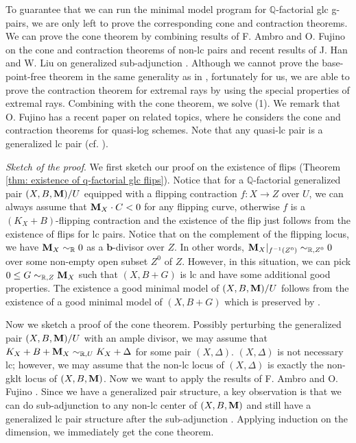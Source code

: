 \documentclass[11pt]{amsart}
\numberwithin{equation}{section}
\newcommand{\bb}{\bm{b}}
\newcommand{\Mm}{{\bf{M}}}
\newcommand{\Qq}{\mathbb{Q}}
\newcommand{\Rr}{\mathbb{R}}
\theoremstyle{definition}
\theoremstyle{definition}
\theoremstyle{definition}
\begin{document}
To guarantee that we can run the minimal model program for $\Qq$-factorial glc g-pairs, we are only left to prove the corresponding cone and contraction theorems. We can prove the cone theorem by combining results of F. Ambro and O. Fujino on the cone and contraction theorems of non-lc pairs \cite{Amb03,Fuj11} and recent results of J. Han and W. Liu  on generalized sub-adjunction \cite{HL19}. Although we cannot prove the base-point-free theorem in the same generality as in \cite{Amb03,Fuj11}, fortunately for us, we are able to prove the contraction theorem for extremal rays by using the special properties of extremal rays. Combining with the cone theorem, we solve (1). We remark that O. Fujino has a recent paper \cite{Fuj21} on related topics, where he considers the cone and contraction theorems for quasi-log schemes. Note that any quasi-lc pair is a generalized lc pair (cf. \cite[Remark 1.9]{Fuj18}).

\medskip

\noindent\textit{Sketch of the proof}. We first sketch our proof on the existence of flips (Theorem \ref{thm: existence of q-factorial glc flips}). Notice that for a $\Qq$-factorial generalized pair $(X,B,\Mm)/U$ equipped with a flipping contraction $f: X\rightarrow Z$ over $U$, we can always assume that $\Mm_X\cdot C<0$ for any flipping curve, otherwise $f$ is a $(K_X+B)$-flipping contraction and the existence of the flip just follows from the existence of flips for lc pairs. Notice that on the complement of the flipping locus, we have $\Mm_X\sim_{\Rr}0$ as a $\bb$-divisor over $Z$. In other words, $\Mm_X|_{f^{-1}(Z^0)}\sim_{\Rr,Z^0}0$ over some non-empty open subset $Z^0$ of $Z$. However, in this situation, we can pick $0\leq G\sim_{\Rr,Z}\Mm_X$ such that $(X,B+G)$ is lc and have some additional good properties. The existence a good minimal model of $(X,B,\Mm)/U$ follows from the existence of a good minimal model of $(X,B+G)$ which is preserved by \cite{HX13,Has19}.

Now we sketch a proof of the cone theorem. Possibly perturbing the generalized pair $(X,B,\Mm)/U$ with an ample divisor, we may assume that $K_X+B+\Mm_X\sim_{\Rr,U}K_X+\Delta$ for some pair $(X,\Delta)$. $(X,\Delta)$ is not necessary lc; however, we may assume that the non-lc locus of $(X,\Delta)$ is exactly the non-gklt locus of $(X,B,\Mm)$. Now we want to apply the results of F. Ambro \cite{Amb03} and O. Fujino \cite{Fuj11}. Since we have a generalized pair structure, a key observation is that we can do sub-adjunction to any non-lc center of $(X,B,\Mm)$ and still have a generalized lc pair structure after the sub-adjunction \cite{HL19}. Applying induction on the dimension, we immediately get the cone theorem. 
\end{document}
